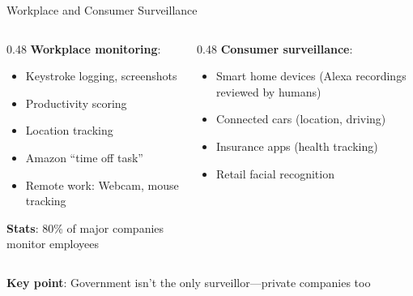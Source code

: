 ﻿\documentclass[aspectratio=169,11pt]{beamer}
\begin{document}
\begin{frame}{Workplace and Consumer Surveillance}
\begin{columns}[T]
\begin{column}{0.48\textwidth}
\textbf{Workplace monitoring}:
\begin{itemize}
    \item Keystroke logging, screenshots
    \item Productivity scoring
    \item Location tracking
    \item Amazon ``time off task''
    \item Remote work: Webcam, mouse tracking
\end{itemize}

\textbf{Stats}: 80\% of major companies monitor employees
\end{column}
\begin{column}{0.48\textwidth}
\textbf{Consumer surveillance}:
\begin{itemize}
    \item Smart home devices (Alexa recordings reviewed by humans)
    \item Connected cars (location, driving)
    \item Insurance apps (health tracking)
    \item Retail facial recognition
\end{itemize}
\end{column}
\end{columns}

\vspace{0.3em}
\textbf{Key point}: Government isn't the only surveillor---private companies too
\end{frame}
\end{document}
